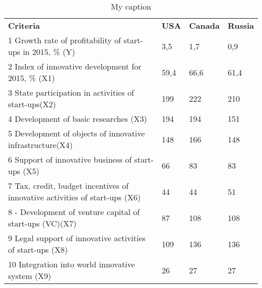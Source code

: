 \begin{table}[]
\centering
\caption{My caption}
\label{my-label}
\begin{tabular}{llll}
\textbf{Criteria}                                                           & \textbf{USA} & \textbf{Canada} & \textbf{Russia} \\
1 Growth rate of profitability of start-ups in 2015, \% (Y)                 & 3,5          & 1,7             & 0,9             \\
2 Index of innovative development for 2015, \% (X1)                         & 59,4         & 66,6            & 61,4            \\
3 State participation in activities of start-ups(X2)                        & 199          & 222             & 210             \\
4 Development of basic researches (X3)                                      & 194          & 194             & 151             \\
5 Development of objects of innovative infrastructure(X4)                   & 148          & 166             & 148             \\
6 Support of innovative business of start-ups (X5)                          & 66           & 83              & 83              \\
7 Tax, credit, budget incentives of innovative activities of start-ups (X6) & 44           & 44              & 51              \\
8 - Development of venture capital of start-ups (VC)(X7)                    & 87           & 108             & 108             \\
9 Legal support of innovative activities of start-ups (X8)                  & 109          & 136             & 136             \\
10 Integration into world innovative system (X9)                            & 26           & 27              & 27             
\end{tabular}
\end{table}

